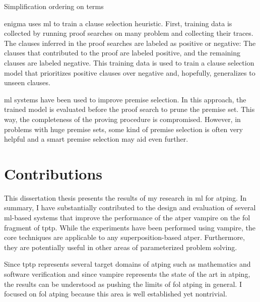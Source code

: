 Simplification ordering on terms


\Gls{enigma} uses \gls{ml} to train a clause selection heuristic.
First, training data is collected by running proof searches on many problem and collecting their traces.
The clauses inferred in the proof searches are labeled as positive or negative:
The clauses that contributed to the proof are labeled positive, and the remaining clauses are labeled negative.
This training data is used to train a clause selection model that prioritizes positive clauses over negative and, hopefully, generalizes to unseen clauses.

\Gls{ml} systems have been used to improve premise selection.
In this approach, the trained model is evaluated before the proof search to prune the premise set.
This way, the completeness of the proving procedure is compromised.
However, in problems with huge premise sets, some kind of premise selection is often very helpful and a smart premise selection may aid even further.



\chapter{Contributions}

This dissertation thesis presents the results of my research in \gls{ml} for \gls{atping}.
In summary, I have substantially contributed to the design and evaluation of several \acrshort{ml}-based systems that improve the performance of the \gls{atper} \gls{vampire} on the \gls{fol} fragment of \gls{tptp}.
While the experiments have been performed using \gls{vampire},
the core techniques are applicable to any \gls{superposition}-based \gls{atper}.
Furthermore, they are potentially useful in other areas of parameterized problem solving.

Since \gls{tptp} represents several target domains of \gls{atping}
such as mathematics and software verification
and since \gls{vampire} represents the state of the art in \gls{atping},
the results can be understood as pushing the limits of \gls{fol} \gls{atping} in general.
I focused on \gls{fol} \gls{atping} because this area is well established yet nontrivial.

